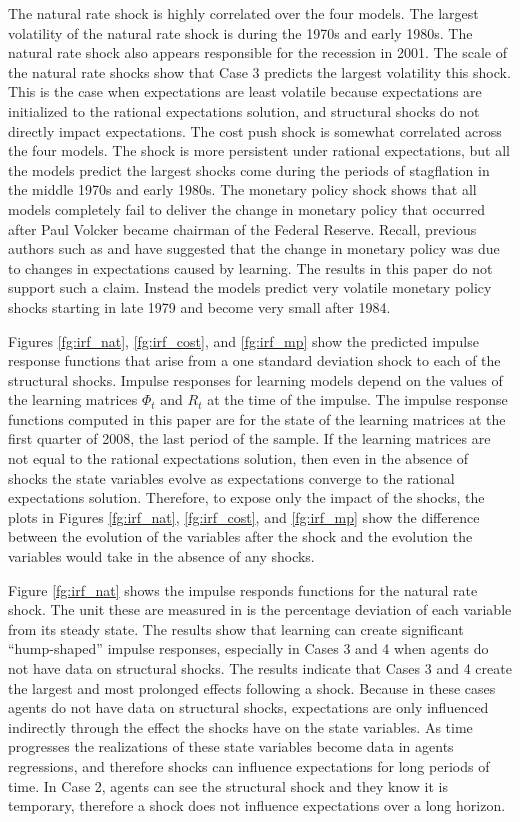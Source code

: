 The natural rate shock is highly correlated over the four models.  The largest volatility of the natural rate shock is during the 1970s and early 1980s.  The natural rate shock also appears responsible for the recession in 2001.  The scale of the natural rate shocks show that Case 3 predicts the largest volatility this shock.  This is the case when expectations are least volatile because expectations are initialized to the rational expectations solution, and structural shocks do not directly impact expectations.  The cost push shock is somewhat correlated across the four models.  The shock is more persistent under rational expectations, but all the models predict the largest shocks come during the periods of stagflation in the middle 1970s and early 1980s.  The monetary policy shock shows that all models completely fail to deliver the change in monetary policy that occurred after Paul Volcker became chairman of the Federal Reserve.  Recall, previous authors such as  and  have suggested that the change in monetary policy was due to changes in expectations caused by learning.  The results in this paper do not support such a claim.  Instead the models predict very volatile monetary policy shocks starting in late 1979 and become very small after 1984.

Figures \ref{fg:irf_nat}, \ref{fg:irf_cost}, and \ref{fg:irf_mp} show the predicted impulse response functions that arise from a one standard deviation shock to each of the structural shocks.  Impulse responses for learning models depend on the values of the learning matrices $\Phi_t$ and $R_t$ at the time of the impulse.  The impulse response functions computed in this paper are for the state of the learning matrices at the first quarter of 2008, the last period of the sample.  If the learning matrices are not equal to the rational expectations solution, then even in the absence of shocks the state variables evolve as expectations converge to the rational expectations solution.  Therefore, to expose only the impact of the shocks, the plots in Figures \ref{fg:irf_nat}, \ref{fg:irf_cost}, and \ref{fg:irf_mp} show the difference between the evolution of the variables after the shock and the evolution the variables would take in the absence of any shocks.

Figure \ref{fg:irf_nat} shows the impulse responds functions for the natural rate shock.  The unit these are measured in is the percentage deviation of each variable from its steady state.  The results show that learning can create significant ``hump-shaped'' impulse responses, especially in Cases 3 and 4 when agents do not have data on structural shocks.  The results indicate that Cases 3 and 4 create the largest and most prolonged effects following a shock.  Because in these cases agents do not have data on structural shocks, expectations are only influenced indirectly through the effect the shocks have on the state variables.  As time progresses the realizations of these state variables become data in agents regressions, and therefore shocks can influence expectations for long periods of time.  In Case 2, agents can see the structural shock and they know it is temporary, therefore a shock does not influence expectations over a long horizon.

